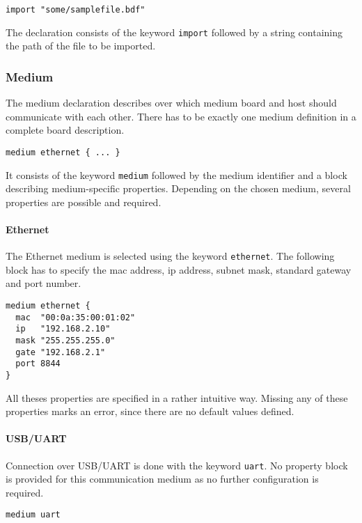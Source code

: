 \documentclass{report}
\begin{document}
\begin{lstlisting}[language=bdl]
import "some/samplefile.bdf"
\end{lstlisting}

The declaration consists of the keyword \texttt{import} followed by a string containing the path of the file to be imported.

\subsubsection{Medium}
The medium declaration describes over which medium board and host should communicate with each other. There has to be exactly one medium definition in a complete board description.

\begin{lstlisting}[language=bdl]
medium ethernet { ... }
\end{lstlisting}

It consists of the keyword \texttt{medium} followed by the medium identifier and a block describing medium-specific properties. Depending on the chosen medium, several properties are possible and required.

\paragraph{Ethernet}
The Ethernet medium is selected using the keyword \texttt{ethernet}. The following block has to specify the mac address, ip address, subnet mask, standard gateway and port number.

\begin{lstlisting}[language=bdl]
medium ethernet {
  mac  "00:0a:35:00:01:02"
  ip   "192.168.2.10"
  mask "255.255.255.0"
  gate "192.168.2.1"
  port 8844
}
\end{lstlisting}

All theses properties are specified in a rather intuitive way. Missing any of these properties marks an error, since there are no default values defined.

\paragraph{USB/UART}
Connection over USB/UART is done with the keyword \texttt{uart}. No property block is provided for this communication medium as no further configuration is required.

\begin{lstlisting}[language=bdl]
medium uart
\end{lstlisting}
\end{document}
